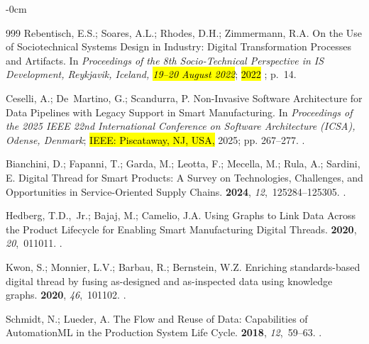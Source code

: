 \documentclass[systems,article,accept,pdftex,moreauthors]{Definitions/mdpi}
\begin{document}
\begin{adjustwidth}{-\extralength}{0cm}
\begin{thebibliography}{999}
Rebentisch, E.S.; Soares, A.L.; Rhodes, D.H.; Zimmermann, R.A.
\newblock On the Use of Sociotechnical Systems Design in Industry: Digital
  Transformation Processes and Artifacts.
\newblock In \textit{Proceedings of the 8th Socio-Technical
  Perspective in IS Development, Reykjavik, Iceland, \hl{19--20 August 2022}}; \hl{2022}%
; p.~14.

Ceselli, A.; De~Martino, G.; Scandurra, P.
\newblock Non-Invasive Software Architecture for Data Pipelines with Legacy
  Support in Smart Manufacturing.
\newblock In \textit{Proceedings of the 2025 IEEE 22nd International Conference on
  Software Architecture (ICSA), Odense, Denmark}; \hl{IEEE: Piscataway, NJ, USA,} %
  2025; pp. 267--277.
.

Bianchini, D.; Fapanni, T.; Garda, M.; Leotta, F.; Mecella, M.; Rula, A.;
  Sardini, E.
\newblock Digital Thread for Smart Products: A Survey on Technologies,
  Challenges, and Opportunities in Service-Oriented Supply Chains.
 {\bf 2024}, {\em 12},~125284--125305.
.

Hedberg, T.D.,~Jr.; Bajaj, M.; Camelio, J.A.
\newblock Using Graphs to Link Data Across the Product Lifecycle for Enabling
  Smart Manufacturing Digital Threads.
 {\bf 2020}, {\em 20},~011011.
.

Kwon, S.; Monnier, L.V.; Barbau, R.; Bernstein, W.Z.
\newblock Enriching standards-based digital thread by fusing as-designed and
  as-inspected data using knowledge graphs.
 {\bf 2020}, {\em 46},~101102.
.

Schmidt, N.; Lueder, A.
\newblock The Flow and Reuse of Data: Capabilities of AutomationML in the
  Production System Life Cycle.
 {\bf 2018}, {\em 12},~59--63.
.


\end{thebibliography}
\end{adjustwidth}
\end{document}
